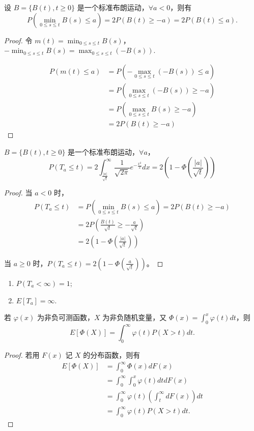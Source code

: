 \documentclass[lang=cn,10pt,thmcnt=section]{elegantbook}
\begin{document}
\begin{theorem}
	设 $B = \{B(t), t \geq 0\}$ 是一个标准布朗运动，$\forall a < 0$，则有
\[ P\left(\min_{0 \leq s \leq t} B(s) \leq a\right) = 2P(B(t) \geq -a) = 2P(B(t) \leq a). \]

\end{theorem}
\begin{proof}
	令 $m(t) = \min_{0 \leq s \leq t} B(s)$，$-\min_{0 \leq s \leq t} B(s) = \max_{0 \leq s \leq t} (-B(s))$.

\begin{align*}
P(m(t) \leq a) &= P(-\max_{0 \leq s \leq t} (-B(s)) \leq a) \\
&= P(\max_{0 \leq s \leq t} (-B(s)) \geq -a) \\
&= P(\max_{0 \leq s \leq t} B(s) \geq -a) \\
&= 2P(B(t) \geq -a)
\end{align*}
\end{proof}

\begin{theorem}
	$B = \{B(t), t \geq 0\}$ 是一个标准布朗运动，$\forall a$，
\[ P(T_a \leq t) = 2 \int_{\frac{|a|}{\sqrt{t}}}^{\infty} \frac{1}{\sqrt{2\pi}} e^{-\frac{x^2}{2}} dx = 2(1 - \Phi(\frac{|a|}{\sqrt{t}})) \]

\end{theorem}
\begin{proof}
	当 $a < 0$ 时，
\begin{align*}
P(T_a \leq t) &= P\left(\min_{0 \leq s \leq t} B(s) \leq a\right) = 2P(B(t) \geq -a) \\
&= 2P\left(\frac{B(t)}{\sqrt{t}} \geq -\frac{a}{\sqrt{t}}\right) \\
&= 2(1 - \Phi(\frac{|a|}{\sqrt{t}}))
\end{align*}

当 $a \geq 0$ 时，$P(T_a \leq t) = 2(1 - \Phi(\frac{a}{\sqrt{t}}))$。

\end{proof}

\begin{remark}
	\begin{enumerate}
		\item $P(T_a < \infty) = 1$;
		\item $E[T_a] = \infty$.
	\end{enumerate}
\end{remark}

\begin{example}
	若 $\varphi(x)$ 为非负可测函数，$X$ 为非负随机变量，又 $\Phi(x) = \int_0^x \varphi(t) dt$，则
\[ E[\Phi(X)] = \int_0^\infty \varphi(t) P(X > t) dt. \]
\end{example}
\begin{proof}
	若用 $F(x)$ 记 $X$ 的分布函数，则有
\begin{align*}
E[\Phi(X)] &= \int_0^\infty \Phi(x) dF(x) \\
&= \int_0^\infty \int_0^x \varphi(t) dt dF(x) \\
&= \int_0^\infty \varphi(t) \left( \int_t^\infty dF(x) \right) dt \\
&= \int_0^\infty \varphi(t) P(X > t) dt.
\end{align*}
\end{proof}
\end{document}
